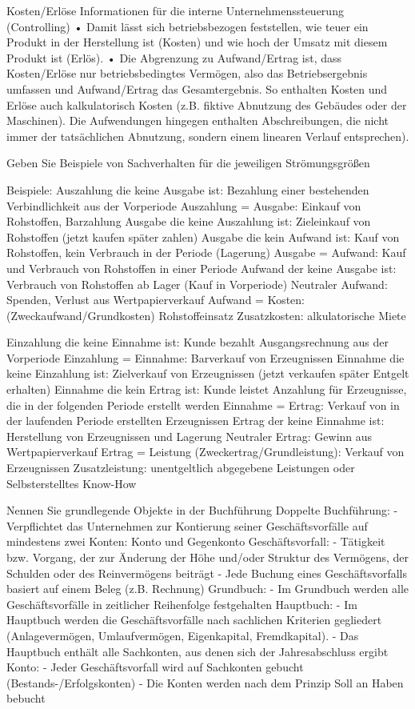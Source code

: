 Kosten/Erlöse
Informationen für die interne Unternehmenssteuerung (Controlling)
• Damit lässt sich betriebsbezogen feststellen, wie teuer ein Produkt in der Herstellung ist (Kosten) und wie hoch der Umsatz mit diesem Produkt ist (Erlös).
• Die Abgrenzung zu Aufwand/Ertrag ist, dass Kosten/Erlöse nur betriebsbedingtes Vermögen, also das Betriebsergebnis umfassen und Aufwand/Ertrag das
Gesamtergebnis. So enthalten Kosten und Erlöse auch kalkulatorisch Kosten (z.B. fiktive Abnutzung des Gebäudes oder der Maschinen). Die Aufwendungen
hingegen enthalten Abschreibungen, die nicht immer der tatsächlichen Abnutzung, sondern einem linearen Verlauf entsprechen).

Geben Sie Beispiele von Sachverhalten für die jeweiligen Strömungsgrößen

Beispiele:
Auszahlung die keine Ausgabe ist:
Bezahlung einer bestehenden Verbindlichkeit aus der Vorperiode
Auszahlung = Ausgabe:
Einkauf von Rohstoffen, Barzahlung
Ausgabe die keine Auszahlung ist:
Zieleinkauf von Rohstoffen (jetzt kaufen später zahlen)
Ausgabe die kein Aufwand ist:
Kauf von Rohstoffen, kein Verbrauch in der Periode (Lagerung)
Ausgabe = Aufwand:
Kauf und Verbrauch von Rohstoffen in einer Periode
Aufwand der keine Ausgabe ist:
Verbrauch von Rohstoffen ab Lager (Kauf in Vorperiode)
Neutraler Aufwand: 
Spenden, Verlust aus Wertpapierverkauf
Aufwand = Kosten: (Zweckaufwand/Grundkosten)
Rohstoffeinsatz
Zusatzkosten:
alkulatorische Miete


Einzahlung die keine Einnahme ist:
Kunde bezahlt Ausgangsrechnung aus der Vorperiode
Einzahlung = Einnahme:
Barverkauf von Erzeugnissen
Einnahme die keine Einzahlung ist:
Zielverkauf von Erzeugnissen (jetzt verkaufen später Entgelt erhalten)
Einnahme die kein Ertrag ist:
Kunde leistet Anzahlung für Erzeugnisse, die in der folgenden Periode erstellt werden
Einnahme = Ertrag:
Verkauf von in der laufenden Periode erstellten Erzeugnissen
Ertrag der keine Einnahme ist:
Herstellung von Erzeugnissen und Lagerung
Neutraler Ertrag:
Gewinn aus Wertpapierverkauf
Ertrag = Leistung (Zweckertrag/Grundleistung):
Verkauf von Erzeugnissen
Zusatzleistung:
unentgeltlich abgegebene Leistungen oder Selbsterstelltes Know-How


Nennen Sie grundlegende Objekte in der Buchführung 
Doppelte Buchführung:
- Verpflichtet das Unternehmen zur Kontierung seiner Geschäftsvorfälle auf mindestens zwei Konten: Konto und Gegenkonto
Geschäftsvorfall:
- Tätigkeit bzw. Vorgang, der zur Änderung der Höhe und/oder Struktur des Vermögens, der Schulden oder des Reinvermögens beiträgt
- Jede Buchung eines Geschäftsvorfalls basiert auf einem Beleg (z.B. Rechnung)
Grundbuch:
- Im Grundbuch werden alle Geschäftsvorfälle in zeitlicher Reihenfolge festgehalten
Hauptbuch:
- Im Hauptbuch werden die Geschäftsvorfälle nach sachlichen Kriterien gegliedert (Anlagevermögen, Umlaufvermögen, Eigenkapital, Fremdkapital).
- Das Hauptbuch enthält alle Sachkonten, aus denen sich der Jahresabschluss ergibt
Konto:
- Jeder Geschäftsvorfall wird auf Sachkonten gebucht (Bestands-/Erfolgskonten)
- Die Konten werden nach dem Prinzip Soll an Haben bebucht


